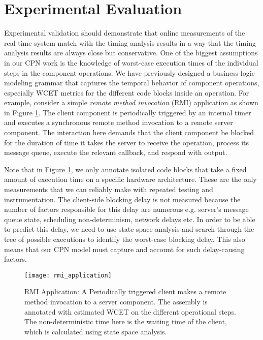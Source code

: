\section{Experimental Evaluation}
\label{sec:experiments}

Experimental validation should demonstrate that online measurements of the real-time system match with the timing analysis results in a way that the timing analysis results are always close but conservative. One of the biggest assumptions in our CPN work is the knowledge of worst-case execution times of the individual steps in the component operations. We have previously designed \cite{SEUS} a business-logic modeling grammar that captures the temporal behavior of component operations, especially WCET metrics for the different code blocks inside an operation. For example, consider a simple \emph{remote method invocation} (RMI) application as shown in Figure \ref{fig:rmi_application}. The client component is periodically triggered by an internal timer and executes a synchronous remote method invocation to a remote server component. The interaction here demands that the client component be blocked for the duration of time it takes the server to receive the operation, process its message queue, execute the relevant callback, and respond with output. 

Note that in Figure \ref{fig:rmi_application}, we only annotate isolated code blocks that take a fixed amount of execution time on a specific hardware architecture. These are the only measurements that we can reliably make with repeated testing and instrumentation. The client-side blocking delay is not measured because the number of factors responsible for this delay are numerous e.g. server's message queue state, scheduling non-determinism, network delays etc. In order to be able to predict this delay, we need to use state space analysis and search through the tree of possible executions to identify the worst-case blocking delay. This also means that our CPN model must capture and account for such delay-causing factors.
 

\begin{figure}[ht]
	\centering
	\texttt{[image: rmi\_application]}
	\caption{RMI Application: A Periodically triggered client makes a remote method invocation to a server component. The assembly is annotated with estimated WCET on the different operational steps. The non-deterministic time here is the waiting time of the client, which is calculated using state space analysis.}
	\label{fig:rmi_application}
\end{figure}

